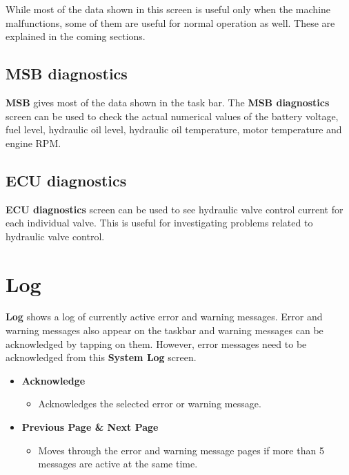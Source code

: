 \documentclass[12pt,a4paper,english]{uvmanual}
\begin{document}

While most of the data shown in this screen is useful only when the machine malfunctions, some of them are useful for normal operation as well. These are explained in the coming sections.

\FloatBarrier
\subsection{MSB diagnostics}\label{ch:system_diagnostics_msb}


\textbf{MSB} gives most of the data shown in the task bar. The \textbf{MSB diagnostics} screen can be used to check the actual numerical values of the battery voltage, fuel level, hydraulic oil level, hydraulic oil temperature, motor temperature and engine RPM.

\FloatBarrier
\subsection{ECU diagnostics}\label{ch:system_diagnostics_ecu}


\textbf{ECU diagnostics} screen can be used to see hydraulic valve control current for each individual valve. This is useful for investigating problems related to hydraulic valve control.

\section{Log}\label{ch:system_log}

\textbf{Log} shows a log of currently active error and warning messages. Error and warning messages also appear on the taskbar and warning messages can be acknowledged by tapping on them. However, error messages need to be acknowledged from this \textbf{System Log} screen. 


\begin{itemize}
 \item \textbf{Acknowledge}
 \begin{itemize}
  \item Acknowledges the selected error or warning message.
 \end{itemize}

 \item \textbf{Previous Page \& Next Page}
 \begin{itemize}
  \item Moves through the error and warning message pages if more than 5 messages are active at the same time.
 \end{itemize}

\end{itemize}
\end{document}
